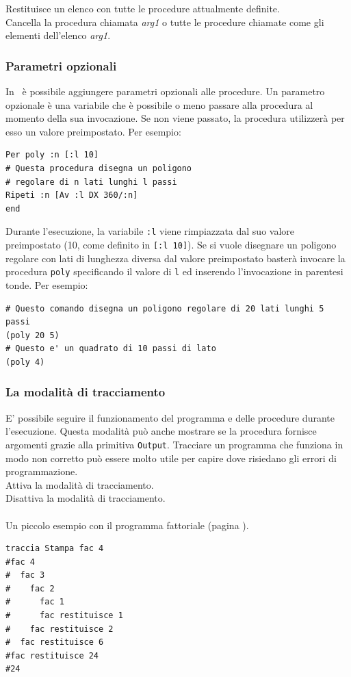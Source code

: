 Restituisce un elenco con tutte le procedure attualmente definite.\\

 Cancella la procedura chiamata \textit{arg1} o tutte le procedure chiamate come gli elementi dell'elenco \textit{arg1}.\\

\subsubsection{Parametri opzionali}
In \xlogo\ è possibile aggiungere parametri opzionali alle procedure. Un parametro opzionale è una variabile che è possibile o meno passare alla procedura al momento della sua invocazione. Se non viene passato, la procedura utilizzerà per esso un valore preimpostato. Per esempio:
\begin{lstlisting}[caption="Procedura con un parametro opzionale"]
Per poly :n [:l 10]
# Questa procedura disegna un poligono 
# regolare di n lati lunghi l passi
Ripeti :n [Av :l DX 360/:n]
end
\end{lstlisting}

Durante l'esecuzione, la variabile \texttt{:l} viene rimpiazzata dal suo valore preimpostato (10, come definito in \texttt{[:l 10]}). Se si vuole disegnare un poligono regolare con lati di lunghezza diversa dal valore preimpostato basterà invocare la procedura \texttt{poly} specificando il valore di \texttt{l} ed inserendo l'invocazione in parentesi tonde. Per esempio:

\begin{lstlisting}[caption="Invocazione di una procedura con un parametro opzionale"]
# Questo comando disegna un poligono regolare di 20 lati lunghi 5 passi
(poly 20 5)
# Questo e' un quadrato di 10 passi di lato
(poly 4)
\end{lstlisting}



\subsubsection{La modalità di tracciamento}
E' possibile seguire il funzionamento del programma e delle procedure durante l'esecuzione. Questa modalità può anche mostrare se la procedura fornisce argomenti grazie alla primitiva \texttt{Output}. Tracciare un programma che funziona in modo non corretto può essere molto utile per capire dove risiedano gli errori di programmazione.\\
Attiva la modalità di tracciamento.\\ 
\prim{}{}
Disattiva la modalità di tracciamento. \\ \\
Un piccolo esempio con il programma fattoriale (pagina \pageref{factorielle}).
\begin{lstlisting}[caption="Tracciamento di un programma"]
traccia Stampa fac 4
#fac 4
#  fac 3
#    fac 2
#      fac 1
#      fac restituisce 1
#    fac restituisce 2
#  fac restituisce 6
#fac restituisce 24
#24
\end{lstlisting}



